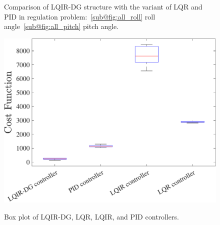 \documentclass[3p]{elsarticle}
\begin{document}
\begin{figure}[H]
    \centering
    \caption{Comparison of LQIR-DG structure with the variant of LQR and PID in regulation problem:~\ref{sub@fig:all_roll} roll angle~\ref{sub@fig:all_pitch} pitch angle.}
    \label{fig:compare}
\end{figure}

\begin{figure}[H]
    \centering
    {\includegraphics[width=.55\linewidth]{../Figure/implementation/box_plot/lqidgvsboxplot}
    }
    \caption{Box plot of LQIR-DG, LQR, LQIR, and PID controllers.}
    \label{fig:compare_boxplot}
\end{figure}
\end{document}
